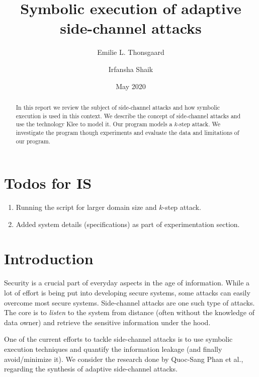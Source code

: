 \documentclass[11pt,a4paper,notitlepage]{article}
\title{Symbolic execution of adaptive side-channel attacks}
\author{Emilie L. Thonsgaard \and Irfansha Shaik}
\date{May 2020}
\begin{document}
\begin{titlingpage}
    \maketitle
    \begin{abstract}
        In this report we review the subject of side-channel attacks and how symbolic execution is used in this context. We describe the concept of side-channel attacks and use the technology Klee to model it. Our program models a $k$-step attack. We investigate the program though experiments and evaluate the data and limitations of our program.
    \end{abstract}
\end{titlingpage}

\tableofcontents
\newpage
\setcounter{section}{-1}


\section{Todos for IS}
\label{sec:todosforis}

\begin{enumerate}
  \item Running the script for larger domain size and $k$-step attack.
  \item Added system details (specifications) as part of experimentation section.
\end{enumerate}

\newpage

\section{Introduction}
\label{cha:introduction}

Security is a crucial part of everyday aspects in the age of information.
While a lot of effort is being put into developing secure systems, some attacks can easily overcome most secure systems.
Side-channel attacks are one such type of attacks. The core is to \emph{listen} to the system from distance (often without the knowledge of data owner) and retrieve the sensitive information under the hood.

One of the current efforts to tackle side-channel attacks is to use symbolic execution techniques and quantify the information leakage (and finally avoid/minimize it).
We consider the research done by Quoc-Sang Phan et al., \cite{phan2017synthesis} regarding the synthesis of adaptive side-channel attacks.
\end{document}

